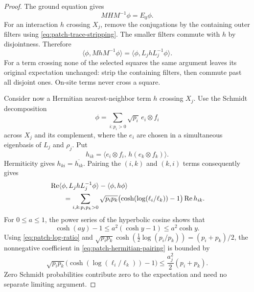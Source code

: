 \documentclass[11pt]{article}
\numberwithin{equation}{section}
\theoremstyle{definition}
\theoremstyle{remark}
\begin{document}
\begin{proof}
The ground equation gives
\[
 M H M^{-1}\phi=E_0\phi.
\]
For an interaction \(h\) crossing \(X_j\), remove the conjugations
by the containing outer filters using
\eqref{eq:patch-trace-stripping}.  The smaller filters commute
with \(h\) by disjointness.  Therefore
\begin{equation}
 \langle\phi,MhM^{-1}\phi\rangle
       =\langle\phi,L_j h L_j^{-1}\phi\rangle.
 \label{eq:patch-single-crossing}
\end{equation}
For a term crossing none of the selected squares the same argument
leaves its original expectation unchanged: strip the containing
filters, then commute past all disjoint ones.  On-site terms never
cross a square.

Consider now a Hermitian nearest-neighbor term \(h\) crossing
\(X_j\).  Use the Schmidt decomposition
\[
 \phi=\sum_{i:p_i>0}\sqrt{p_i}\,
          e_i\otimes f_i
\]
across \(X_j\) and its complement, where the \(e_i\) are chosen
in a simultaneous eigenbasis of \(L_j\) and \(\rho_j\).  Put
\[
 h_{ik}=\langle e_i\otimes f_i,\,
                       h(e_k\otimes f_k)\rangle.
\]
Hermiticity gives \(h_{ki}=\overline{h_{ik}}\).  Pairing the
\((i,k)\) and \((k,i)\) terms consequently gives
\begin{align}
 &\operatorname{Re}\langle\phi,L_j h L_j^{-1}\phi\rangle
           -\langle\phi,h\phi\rangle \notag\\
 &\qquad =
   \sum_{i,k:p_i p_k>0}
      \sqrt{p_i p_k}
      \bigl(\cosh(\log(\ell_i/\ell_k))-1\bigr)
      \operatorname{Re}h_{ik}.
 \label{eq:patch-hermitian-pairing}
\end{align}
For \(0\leq a\leq1\), the power series of the hyperbolic cosine
shows that
\[
 \cosh(ay)-1\leq a^2(\cosh y-1)\leq a^2\cosh y.
\]
Using \eqref{eq:patch-log-ratio} and
\(\sqrt{p_i p_k}\cosh(\tfrac12\log(p_i/p_k))
=(p_i+p_k)/2\), the nonnegative coefficient in
\eqref{eq:patch-hermitian-pairing} is bounded by
\begin{equation}
 \sqrt{p_i p_k}
      \bigl(\cosh(\log(\ell_i/\ell_k))-1\bigr)
       \leq \frac{a_j^2}{2}(p_i+p_k).
 \label{eq:patch-quadratic-coefficient}
\end{equation}
Zero Schmidt probabilities contribute zero to the expectation
and need no separate limiting argument.


\end{proof}
\end{document}
